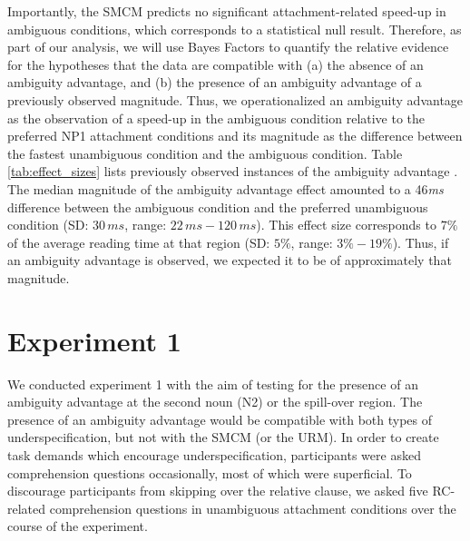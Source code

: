 \documentclass[english, doc]{apa7}\usepackage[]{graphicx}\usepackage[]{color}
\begin{document}
Importantly, the SMCM predicts no significant attachment-related speed-up in ambiguous conditions, which corresponds to a statistical null result. Therefore, as part of our analysis, we will use Bayes Factors \citep[e.g.,][]{LeeWagenmakers:2014, SchonbrodtWagenmakers:2018, NicenboimEtAl:2021} to quantify the relative evidence for the hypotheses that the data are compatible with (a) the absence of an ambiguity advantage, and (b) the presence of an ambiguity advantage of a previously observed magnitude. Thus, we operationalized an ambiguity advantage as the observation of a speed-up in the ambiguous condition relative to the preferred NP1 attachment conditions and its magnitude as the difference between the fastest unambiguous condition and the ambiguous condition.
%
Table \ref{tab:effect_sizes} lists previously observed instances of the ambiguity advantage \citep{SwetsEtAl:2008, TraxlerEtAl:1998, vanGompelEtAl:2005, vanGompelEtAl:2001}. The median magnitude of the ambiguity advantage effect amounted to a 46\emph{ms} difference between the ambiguous condition and the preferred unambiguous condition (SD: $30\,ms$, range: $22\,ms - 120\,ms$).
This effect size corresponds to $7\%$ of the average reading time at that region (SD: $5\%$, range: $3\% - 19\%$).
%
Thus, if an ambiguity advantage is observed, we expected it to be of approximately that magnitude. 


\section{Experiment 1}

We conducted experiment 1 with the aim of testing for the presence of an ambiguity advantage at the second noun (N2) or the spill-over region. The presence of an ambiguity advantage would be compatible with both types of underspecification, but not with the SMCM (or the URM). In order to create task demands which encourage underspecification, participants were asked comprehension questions occasionally, most of which were superficial. To discourage participants from skipping over the relative clause, we asked five RC-related comprehension questions in unambiguous attachment conditions over the course of the experiment.
\end{document}
